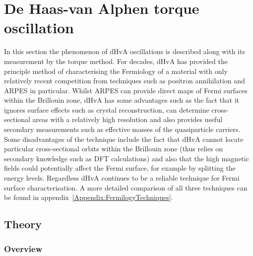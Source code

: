 
\section{De Haas-van Alphen torque oscillation}

In this section the phenomenon of \ac{dHvA} oscillations is described along with its measurement by the torque method. For decades, \ac{dHvA} has provided the principle method of characterising the Fermiology of a material with only relatively recent competition from techniques such as positron annihilation and \ac{ARPES} in particular. Whilst \ac{ARPES} can provide direct maps of Fermi surfaces within the Brillouin zone, \ac{dHvA} has some advantages such as the fact that it ignores surface effects such as crystal reconstruction, can determine cross-sectional areas with a relatively high resolution and also provides useful secondary measurements such as effective masses of the quasiparticle carriers.  Some disadvantages of the technique include the fact that \ac{dHvA} cannot locate particular cross-sectional orbits within the Brillouin zone (thus relies on secondary knowledge such as \ac{DFT} calculations) and also that the high magnetic fields could potentially affect the Fermi surface, for example by splitting the energy levels. Regardless \ac{dHvA} continues to be a reliable technique for Fermi surface characterisation. A more detailed comparison of all three techniques can be found in appendix~\ref{Appendix:FermilogyTechniques}.



\subsection{Theory}

\subsubsection{Overview}


